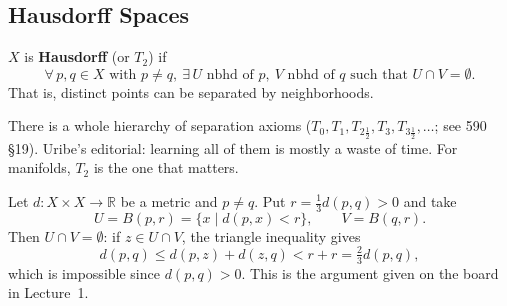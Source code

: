 \documentclass[11pt]{report}
\makeatletter
\newcounter{defcounter}[section]
\newcounter{excounter}[section]
\newcommand{\deflabel}[1]{\edef\@currentlabel{\arabic{section}.\arabic{defcounter}}\label{#1}}
\newcommand{\exlabel}[1]{\edef\@currentlabel{\arabic{section}.\arabic{excounter}}\label{#1}}
\newcommand{\leeref}[1]{\par\smallskip{\raggedleft\footnotesize\textsc{Lee}:\ #1\par}}
\makeatother
\begin{document}
\subsection{Hausdorff Spaces}

\begin{defbox}[Hausdorff ($T_2$)]\deflabel{def:hausdorff-t2}
$X$ is \textbf{Hausdorff} (or $T_2$) if
\[
\forall\, p, q \in X \text{ with } p \neq q,\ \exists\, U \text{ nbhd of } p,\ V \text{ nbhd of } q \text{ such that } U \cap V = \emptyset.
\]
That is, distinct points can be separated by neighborhoods.
\end{defbox}

\begin{rembox}\label{rem:review-3}
There is a whole hierarchy of separation axioms ($T_0, T_1, T_{2\frac12}, T_3, T_{3\frac12}, \ldots$; see 590 \S19). Uribe's editorial: learning all of them is mostly a waste of time. For manifolds, $T_2$ is the one that matters.
\end{rembox}

\begin{exbox}\exlabel{ex:metric-t2}
Let $d : X \times X \to \mathbb{R}$ be a metric and $p \neq q$. Put $r = \tfrac13 d(p, q) > 0$ and take
\[
U = B(p, r) = \{x \mid d(p, x) < r\}, \qquad V = B(q, r).
\]
Then $U \cap V = \emptyset$: if $z \in U \cap V$, the triangle inequality gives
\[
d(p, q) \le d(p, z) + d(z, q) < r + r = \tfrac23 d(p, q),
\]
which is impossible since $d(p,q) > 0$.
This is the argument given on the board in Lecture~1.
\leeref{Example A.5}
\end{exbox}
\begin{center}
\end{center}
\end{document}
